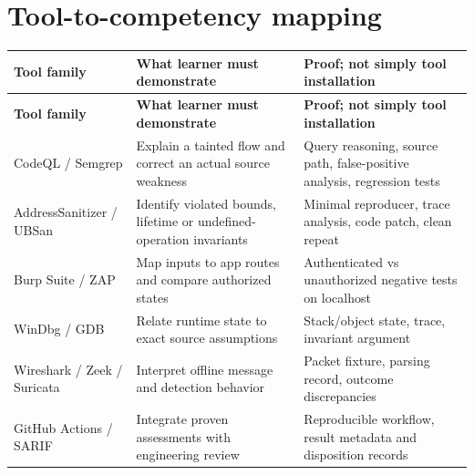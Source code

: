 \documentclass[10pt,letterpaper]{article}
\begin{document}
\section{Tool-to-competency mapping}
\begingroup\footnotesize\setlength\tabcolsep{3pt}
\begin{longtable}{>{\raggedright\arraybackslash}p{}>{\raggedright\arraybackslash}p{}>{\raggedright\arraybackslash}p{}}\toprule
\textbf{Tool family} & \textbf{What learner must demonstrate} & \textbf{Proof; not simply tool installation}\\\midrule\endfirsthead
\toprule \textbf{Tool family} & \textbf{What learner must demonstrate} & \textbf{Proof; not simply tool installation}\\\midrule\endhead
CodeQL / Semgrep & Explain a tainted flow and correct an actual source weakness & Query reasoning, source path, false-positive analysis, regression tests\\\midrule
AddressSanitizer / UBSan & Identify violated bounds, lifetime or undefined-operation invariants & Minimal reproducer, trace analysis, code patch, clean repeat\\\midrule
Burp Suite / ZAP & Map inputs to app routes and compare authorized states & Authenticated vs unauthorized negative tests on localhost\\\midrule
WinDbg / GDB & Relate runtime state to exact source assumptions & Stack/object state, trace, invariant argument\\\midrule
Wireshark / Zeek / Suricata & Interpret offline message and detection behavior & Packet fixture, parsing record, outcome discrepancies\\\midrule
GitHub Actions / SARIF & Integrate proven assessments with engineering review & Reproducible workflow, result metadata and disposition records\\\midrule
\bottomrule\end{longtable}\endgroup
\end{document}
